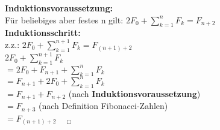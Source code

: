 \documentclass[11pt,a4paper]{article}
\begin{document}
\textbf{Induktionsvoraussetzung:} \\
Für beliebiges aber festes n gilt:
$ 2F_0 + \sum \limits_{k=1}^n F_k = F_{n+2}$ \\

\textbf{Induktionsschritt:} \\
z.z.: $ 2F_0 + \sum \limits_{k=1}^{n+1} F_k = F_{(n+1)+2}$ \\

$ 2F_0 + \sum \limits_{k=1}^{n+1} F_k$ \\
$= 2F_0 + F_{n+1} + \sum \limits_{k=1}^n F_k$ \\
$= F_{n+1} + 2F_0 + \sum \limits_{k=1}^n F_k$ \\
$= F_{n+1} + F_{n+2}$   (nach \textbf{Induktionsvoraussetzung}) \\
$= F_{n+3}$   (nach Definition Fibonacci-Zahlen) \\
$= F_{(n+1)+2}$    $~~~~ _\Box$
\end{document}
